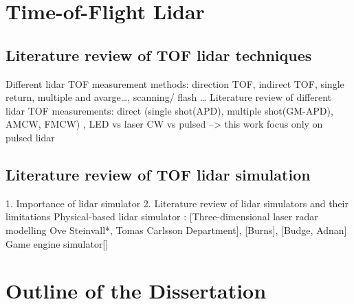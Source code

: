 \section{Time-of-Flight Lidar}
\subsection{Literature review of TOF lidar techniques}
Different lidar TOF measurement methods: direction TOF, indirect TOF, single return, multiple and avarge…, scanning/ flash …
Literature review of different lidar TOF measurements: direct (single shot(APD), multiple shot(GM-APD), AMCW, FMCW) , LED vs laser
CW vs pulsed --> this work focus only on pulsed lidar
\subsection{Literature review of TOF lidar simulation}
1. Importance of lidar simulator
2. Literature review of lidar simulators and their limitations
Physical-based lidar simulator : [Three-dimensional laser radar modelling
Ove Steinvall*, Tomas Carlsson Department], [Burns], [Budge, Adnan]
Game engine simulator[]

\section{Outline of the Dissertation}
